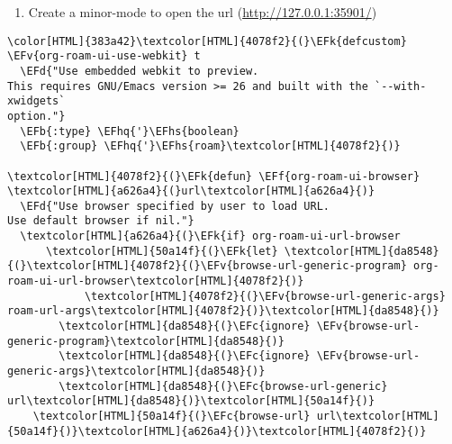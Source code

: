 \documentclass{scrartcl}
\newcommand{\EFk}[1]{\textcolor{EFk}{#1}} %
\newcommand{\EFd}[1]{\textcolor{EFd}{\textit{#1}}} %
\newcommand{\EFb}[1]{\textcolor{EFb}{#1}} %
\newcommand{\EFc}[1]{\textcolor{EFc}{#1}} %
\newcommand{\EFv}[1]{\textcolor{EFv}{#1}} %
\newcommand{\EFf}[1]{\textcolor{EFf}{#1}} %
\newcommand{\EFhq}[1]{\textcolor{EFhq}{#1}} %
\newcommand{\EFhs}[1]{\textcolor{EFhs}{#1}} %
\begin{document}
\begin{enumerate}
\item Create a minor-mode to open the url (\url{http://127.0.0.1:35901/})
\end{enumerate}
\begin{Code}
\begin{Verbatim}[]
\color[HTML]{383a42}\textcolor[HTML]{4078f2}{(}\EFk{defcustom} \EFv{org-roam-ui-use-webkit} t
  \EFd{"Use embedded webkit to preview.
This requires GNU/Emacs version >= 26 and built with the `--with-xwidgets`
option."}
  \EFb{:type} \EFhq{'}\EFhs{boolean}
  \EFb{:group} \EFhq{'}\EFhs{roam}\textcolor[HTML]{4078f2}{)}

\textcolor[HTML]{4078f2}{(}\EFk{defun} \EFf{org-roam-ui-browser} \textcolor[HTML]{a626a4}{(}url\textcolor[HTML]{a626a4}{)}
  \EFd{"Use browser specified by user to load URL.
Use default browser if nil."}
  \textcolor[HTML]{a626a4}{(}\EFk{if} org-roam-ui-url-browser
      \textcolor[HTML]{50a14f}{(}\EFk{let} \textcolor[HTML]{da8548}{(}\textcolor[HTML]{4078f2}{(}\EFv{browse-url-generic-program} org-roam-ui-url-browser\textcolor[HTML]{4078f2}{)}
            \textcolor[HTML]{4078f2}{(}\EFv{browse-url-generic-args} roam-url-args\textcolor[HTML]{4078f2}{)}\textcolor[HTML]{da8548}{)}
        \textcolor[HTML]{da8548}{(}\EFc{ignore} \EFv{browse-url-generic-program}\textcolor[HTML]{da8548}{)}
        \textcolor[HTML]{da8548}{(}\EFc{ignore} \EFv{browse-url-generic-args}\textcolor[HTML]{da8548}{)}
        \textcolor[HTML]{da8548}{(}\EFc{browse-url-generic} url\textcolor[HTML]{da8548}{)}\textcolor[HTML]{50a14f}{)}
    \textcolor[HTML]{50a14f}{(}\EFc{browse-url} url\textcolor[HTML]{50a14f}{)}\textcolor[HTML]{a626a4}{)}\textcolor[HTML]{4078f2}{)}


\end{Verbatim}
\end{Code}
\end{document}
